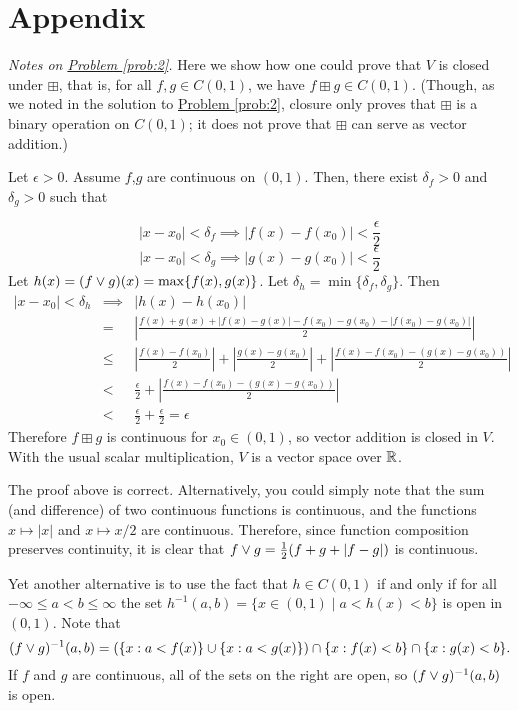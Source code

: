 \section*{Appendix}
\label{appendix}

\noindent
{\it Notes on \hyperref[prob:2]{Problem \ref*{prob:2}}.}
Here we show how one could prove that $V$ is closed under $\boxplus$, that is, 
for all $f, g \in C(0,1)$, we have $f \boxplus g \in C(0,1)$. (Though, as we
noted in the solution to
\hyperref[prob:2]{Problem \ref*{prob:2}}, closure only proves that 
$\boxplus$ is a binary operation on $C(0,1)$; it does not prove that
$\boxplus$ can serve as vector addition.)

Let $\epsilon > 0$. Assume $f$,$g$ are continuous on $(0,1)$. Then, there exist $\delta_f > 0$ and $\delta_g > 0$ such that

$$ |x - x_0| < \delta_f \implies |f(x)-f(x_0)| < \frac{\epsilon}{2}$$ $$|x - x_0| < \delta_g \implies |g(x)-g(x_0)| < \frac{\epsilon}{2}$$
Let $h(x) = (f\vee g)(x) = \max\{f(x),g(x)\}$. Let $\delta_h = \min\{\delta_f,\delta_g\}$. Then
\begin{eqnarray*}
|x - x_0| < \delta_h & \implies & |h(x) - h(x_0)| \\ & = & \left|\frac{f(x)+g(x)+|f(x)-g(x)|-f(x_0)-g(x_0)-|f(x_0)-g(x_0)|}{2}\right| \\
& \leq & \left|\frac{f(x)-f(x_0)}{2}\right| + \left|\frac{g(x)-g(x_0)}{2}\right|
+ \left|\frac{f(x)-f(x_0)-(g(x)-g(x_0))}{2}\right| \\
& < & \frac{\epsilon}{2} + \left|\frac{f(x)-f(x_0)-(g(x)-g(x_0))}{2}\right| \\
& < & \frac{\epsilon}{2} + \frac{\epsilon}{2} = \epsilon
\end{eqnarray*}
Therefore $f \boxplus g$ is continuous for $x_0 \in (0,1)$, so vector addition is closed in $V$. With the usual scalar multiplication, $V$ is a vector space over $\mathbb{R}$.

\bigskip

 The proof above is correct.  Alternatively, you could simply note that
the sum (and difference) of two continuous functions is continuous, and the
functions  $x \mapsto |x|$ and $x \mapsto x/2$ are continuous.  Therefore, since
function composition preserves continuity, it is clear that
$f \vee g = \frac{1}{2}(f+g+|f-g|)$ is continuous. 

Yet another alternative is to use the fact that
$h \in C(0,1)$ if and only if for all $-\infty\leq a < b \leq \infty$ the set
$h^{-1}(a, b) = \{x \in (0,1) \mid a< h(x) < b\}$ is open in $(0,1)$.
Note that
\[
(f\vee g)^{-1}(a, b) =
\left(\{x : a< f(x)\}\cup \{x : a< g(x)\}\right) \cap
\{x : f(x)< b\} \cap \{x : g(x)<b\}.
\]
If $f$ and $g$ are continuous, all of the sets on the right are open, so
$(f\vee g)^{-1}(a, b)$ is open.


